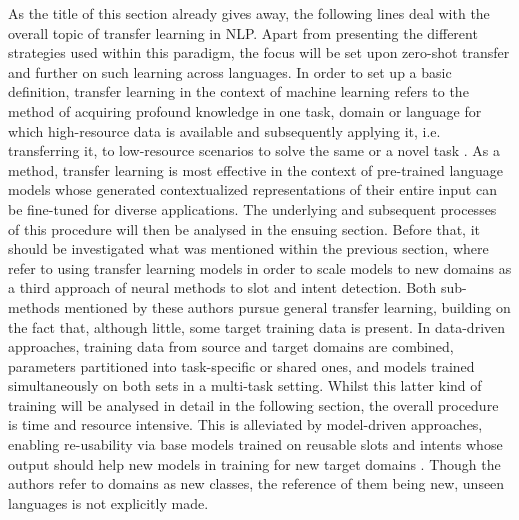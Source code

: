 \documentclass[11pt,a4paper,twoside,openright]{scrbook}
\begin{document}
As the title of this section already gives away, the following lines deal with the overall topic of transfer learning in NLP. Apart from presenting the different strategies used within this paradigm, the focus will be set upon zero-shot transfer and further on such learning across languages.
In order to set up a basic definition, transfer learning in the context of machine learning refers to the method of acquiring profound knowledge in one task, domain or language for which high-resource data is available and subsequently applying it, i.e. transferring it, to low-resource scenarios to solve the same or a novel task \citep{jurafsky_martin_processing}. As a method, transfer learning is most effective in the context of pre-trained language models whose generated contextualized representations of their entire input can be fine-tuned for diverse applications. The underlying and subsequent processes of this procedure will then be analysed in the ensuing section. Before that, it should be investigated what was mentioned within the previous section, where \citet{louvan-magnini-2020-recent} refer to using transfer learning models in order to scale models to new domains as a third approach of neural methods to slot and intent detection. Both sub-methods mentioned by these authors pursue general transfer learning, building on the fact that, although little, some target training data is present. In data-driven approaches, training data from source and target domains are combined, parameters partitioned into task-specific or shared ones, and models trained simultaneously on both sets in a multi-task setting. Whilst this latter kind of training will be analysed in detail in the following section, the overall procedure is time and resource intensive. This is alleviated by model-driven approaches, enabling re-usability via base models trained on reusable slots and intents whose output should help new models in training for new target domains \citep{louvan-magnini-2020-recent}. Though the authors refer to domains as new classes, the reference of them being new, unseen languages is not explicitly made.
\end{document}
